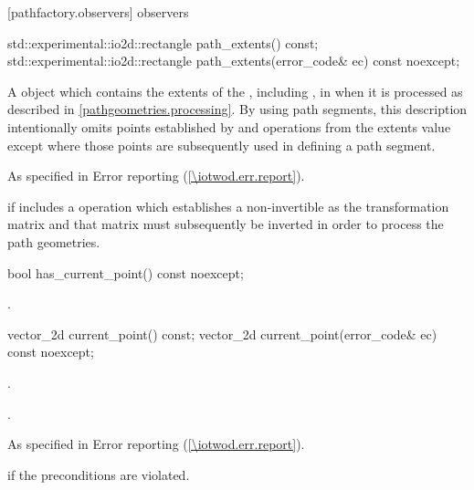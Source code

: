  [pathfactory.observers] { observers}

\begin{itemdecl}
    std::experimental::io2d::rectangle path_extents() const;
    std::experimental::io2d::rectangle path_extents(error_code& ec) const noexcept;
\end{itemdecl}
\begin{itemdescr}
	\pnum
	\returns
	A  object which contains the extents of the , including , in  when it is processed as described in \ref{pathgeometries.processing}.
	\enternote
	By using path segments, this description intentionally omits points established by  and  operations from the extents value except where those points are subsequently used in defining a path segment.
	\exitnote

	\pnum
	\throws
	As specified in Error reporting (\ref{\iotwod.err.report}).

	\pnum
	\errors
	 if  includes a  operation which establishes a non-invertible  as the transformation matrix and that matrix must subsequently be inverted in order to process the path geometries.
\end{itemdescr}

\begin{itemdecl}
    bool has_current_point() const noexcept;
\end{itemdecl}
\begin{itemdescr}
	\pnum
	\returns
	.

\end{itemdescr}

\begin{itemdecl}
    vector_2d current_point() const;
    vector_2d current_point(error_code& ec) const noexcept;
\end{itemdecl}
\begin{itemdescr}
	\pnum
	\preconditions
	.
	
	\pnum
	\returns
	.

	\pnum
	\throws
	As specified in Error reporting (\ref{\iotwod.err.report}).

	\pnum
	\errors
	 if the preconditions are violated.
	
\end{itemdescr}

